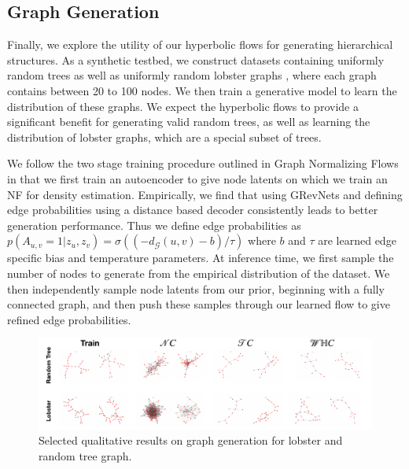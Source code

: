 \subsection{Graph Generation}

Finally, we explore the utility of our hyperbolic flows for generating hierarchical structures. 
As a synthetic testbed, we construct datasets containing uniformly random trees as well as uniformly random lobster graphs \cite{golomb1996polyominoes}, where each graph contains between 20 to 100 nodes. 
We then train a generative model to learn the distribution of these graphs. 
We expect the hyperbolic flows to provide a significant benefit for generating valid random trees, as well as learning the distribution of lobster graphs, which are a special subset of trees. 

We follow the two stage training procedure outlined in Graph Normalizing Flows \cite{liu2019graph} in that we first train an autoencoder to give node latents on which we train an NF for density estimation. Empirically, we find that using GRevNets \cite{liu2019graph} and defining edge probabilities using a distance based decoder consistently leads to better generation performance. Thus we define edge probabilities as $p(A_{u,v}=1|z_u,z_v) = \sigma((-d_{\mathcal{G}}(u,v) - b)/\tau)$ where $b$ and $\tau$ are learned edge specific bias and temperature parameters. At inference time, we first sample the number of nodes to generate from the empirical distribution of the dataset. We then independently sample node latents from our prior, beginning with a fully connected graph, and then push these samples through our learned flow to give refined edge probabilities.

\begin{figure}
    \centering
    \includegraphics[width=\textwidth]{hyperbolic_graph_gen.pdf}
    \vspace{-5mm}
    \caption{Selected qualitative results on graph generation for lobster and random tree graph.}
    \label{fig:graph_generation_pic}
\end{figure}

